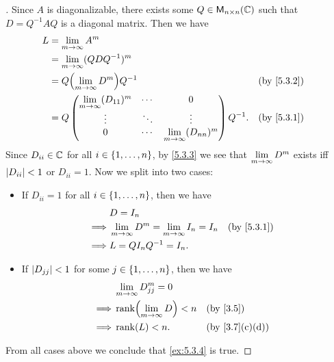 \begin{proof}[]
  Since \(A\) is diagonalizable, there exists some \(Q \in \ms[n][n][\C]\) such that \(D = Q^{-1} A Q\) is a diagonal matrix.
  Then we have
  \begin{align*}
    L & = \Lim_{m \to \infty} A^m                                                                     \\
      & = \Lim_{m \to \infty} (Q D Q^{-1})^m                                                          \\
      & = Q \pa{\Lim_{m \to \infty} D^m} Q^{-1}                                       &  & \by{5.3.2} \\
      & = Q \begin{pmatrix}
              \Lim_{m \to \infty} (D_{1 1})^m & \cdots & 0                               \\
              \vdots                          & \ddots & \vdots                          \\
              0                               & \cdots & \Lim_{m \to \infty} (D_{n n})^m
            \end{pmatrix} Q^{-1}. &  & \by{5.3.1}                \\
  \end{align*}
  Since \(D_{i i} \in \mathbb{C}\) for all \(i \in \left\lbrace1, \dots, n\right\rbrace\), by \cref{5.3.3} we see that \(\lim\limits_{m \to \infty} D^m\) exists iff \(\left\lvert D_{i i}\right\rvert < 1\) or \(D_{i i} = 1\).
  Now we split into two cases:
  \begin{itemize}
    \item If \(D_{i i} = 1\) for all \(i \in \left\lbrace1, \dots, n\right\rbrace\), then we have
          \begin{align*}
                     & D = I_n                                                                 \\
            \implies & \Lim_{m \to \infty} D^m = \Lim_{m \to \infty} I_n = I_n &  & \by{5.3.1} \\
            \implies & L = Q I_n Q^{-1} = I_n.
          \end{align*}
    \item If \(\left\lvert D_{j j}\right\rvert < 1\) for some \(j \in \left\lbrace1, \dots, n\right\rbrace\), then we have
          \begin{align*}
                     & \Lim_{m \to \infty} D_{j j}^m = 0                    \\
            \implies & \rk{\Lim_{m \to \infty} D} < n    &  & \by{3.5}      \\
            \implies & \rk{L} < n.                       &  & \by{3.7}[c,d]
          \end{align*}
  \end{itemize}
  From all cases above we conclude that \cref{ex:5.3.4} is true.
\end{proof}

